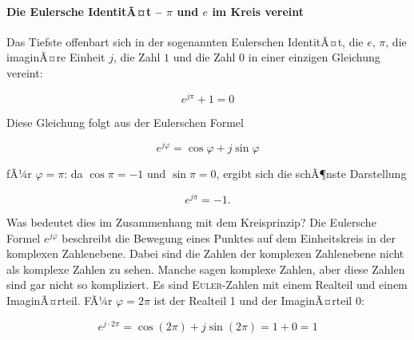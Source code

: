 ﻿\documentclass[a4paper,12pt]{article}
\theoremstyle{definition}
\begin{document}
\paragraph{Die Eulersche IdentitÃ¤t -- $\pi$ und $e$ im Kreis vereint}

Das Tiefste offenbart sich in der sogenannten Eulerschen IdentitÃ¤t, die $e$,
$\pi$, die imaginÃ¤re Einheit $j$, die Zahl $1$ und die Zahl $0$ in einer einzigen
Gleichung vereint:

\begin{equation}
	e^{j\pi} + 1 = 0
\end{equation}

Diese Gleichung folgt aus der Eulerschen Formel

\begin{equation}
	e^{j\varphi} = \cos\varphi + j\sin\varphi
\end{equation}

fÃ¼r $\varphi = \pi$: da $\cos\pi = -1$ und $\sin\pi = 0$, ergibt sich die schÃ¶nste Darstellung

\begin{equation}
	e^{j\pi} = -1.
\end{equation}
	
Was bedeutet dies im Zusammenhang mit dem Kreisprinzip? Die Eulersche Formel
$e^{j\varphi}$ beschreibt die Bewegung eines Punktes auf dem Einheitskreis in
der komplexen Zahlenebene. Dabei sind die Zahlen der komplexen Zahlenebene nicht als komplexe Zahlen zu sehen. Manche sagen komplexe Zahlen, aber diese Zahlen sind gar nicht so kompliziert. Es sind \textsc{Euler}-Zahlen mit einem Realteil und einem ImaginÃ¤rteil. FÃ¼r $\varphi = 2\pi$ ist der Realteil 1 und der ImaginÃ¤rteil 0:

\begin{equation}
	e^{j \cdot 2\pi} = \cos(2\pi) + j\sin(2\pi) = 1 + 0 = 1
\end{equation}
\end{document}
